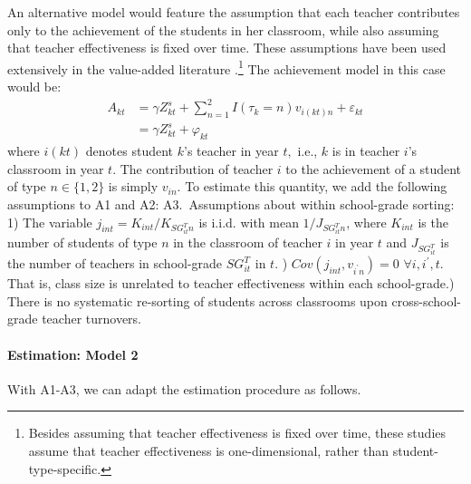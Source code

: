 \documentclass[notitlepage,12pt]{article}%
\begin{document}
An alternative model would feature the assumption that each teacher
contributes only to the achievement of the students in her classroom, while
also assuming that teacher effectiveness is fixed over time. These assumptions
have been used extensively in the value-added literature
\citep[e.g.][]{rockoff2004impact,aaronson2007teachers,kane2008estimating}.\footnote{Besides
assuming that teacher effectiveness is fixed over time, these studies assume
that teacher effectiveness is one-dimensional, rather than
student-type-specific.} The achievement model in this case would be:%
\begin{align}
A_{kt} &  =\gamma Z_{kt}^{s}+\sum_{n=1}^{2}I\left(  \tau_{k}=n\right)
v_{i(kt)n}+\varepsilon_{kt}\label{achievement_ols_A2}\\
&  =\gamma Z_{kt}^{s}+\varphi_{kt}%
\end{align}
where $i(kt)$ denotes student $k$'s teacher in year $t,$ i.e., $k$ is in
teacher $i$'s classroom in year $t$. The contribution of teacher $i$ to the
achievement of a student of type $n\in\{1,2\}$ is simply $v_{in}$. To estimate
this quantity, we add the following assumptions to A1 and A2: \newline
\newline A3.\ Assumptions about within school-grade sorting: 1) The
variable $j_{int}=K_{int}/K_{SG_{it}^{T}n}$ is i.i.d. with mean $1/J_{SG_{it}%
^{T}n}$, where $K_{int}$ is the number of students of type $n$ in the
classroom of teacher $i$ in year $t$ and $J_{SG_{it}^{T}}$ is the number of
teachers in school-grade $SG_{it}^{T}$ in $t$. ) $Cov(j_{int}%
,v_{i^{\prime}n})=0$ $\forall i,i^{\prime},t$. That is, class size is
unrelated to teacher effectiveness within each school-grade.) There
is no systematic re-sorting of students across classrooms upon
cross-school-grade teacher turnovers.

\paragraph{Estimation: Model 2}

With A1-A3, we can adapt the estimation procedure as follows.
\end{document}
